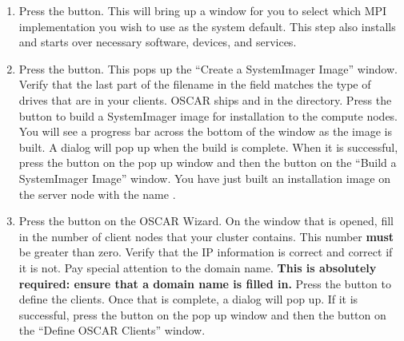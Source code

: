 \begin {enumerate}
\begin{verbatim}
  # ./install_cluster <device>
\end{verbatim}
  
  In the above command, substitute the device name (e.g., \emph{eth1})
  in place of  for your server's private network
  ethernet adapter.  After  successfully
  completes some initial setup, it will display the OSCAR wizard GUI.


\item Press the  button.
  This will bring up a window for you to select which MPI
  implementation you wish to use as the system default.  This step
  also installs and starts over necessary software, devices, and
  services.


\item Press the  button.  This pops
  up the ``Create a SystemImager Image'' window. Verify that the last
  part of the filename in the  field
  matches the type of drives that are in your clients. OSCAR ships
   and  in the
   directory.  Press the  button
  to build a SystemImager image for installation to the compute nodes.
  You will see a progress bar across the bottom of the window as the
  image is built.  A dialog will pop up when the build is complete.
  When it is successful, press the  button on the pop up
  window and then the  button on the ``Build a
  SystemImager Image'' window. You have just built an installation
  image on the server node with the name .

  
\item Press the  button on the OSCAR
  Wizard.  On the window that is opened, fill in the number of client
  nodes that your cluster contains.  This number {\bf must} be greater
  than zero.  Verify that the IP information is correct and correct if
  it is not.  Pay special attention to the domain name. {\bf This is
    absolutely required: ensure that a domain name is filled in.}
  Press the  button to define the clients. Once that
  is complete, a dialog will pop up.  If it is successful, press the
   button on the pop up window and then the
   button on the ``Define OSCAR Clients'' window.


\end{enumerate}
